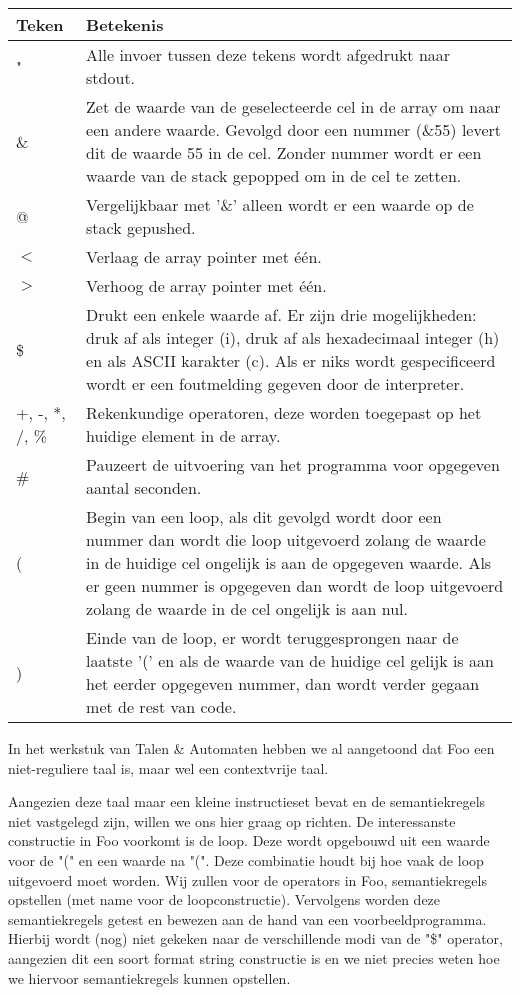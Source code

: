 \documentclass[11pt]{article}
\begin{document}
\begin{center}
    \begin{tabular}{ | l | p{15cm} |}
    \hline
    Teken & Betekenis \\ \hline
    " & Alle invoer tussen deze tekens wordt afgedrukt naar stdout. \\ \hline
    \& & Zet de waarde van de geselecteerde cel in de array om naar een andere waarde. Gevolgd door een nummer (\&55) levert dit de waarde 55 in de cel. Zonder nummer wordt er een waarde van de stack gepopped om in de cel te zetten. \\ \hline
    @ & Vergelijkbaar met '\&' alleen wordt er een waarde op de stack gepushed. \\ \hline
    \(<\) & Verlaag de array pointer met \'e\'en. \\ \hline
    \(>\) & Verhoog de array pointer met \'e\'en. \\ \hline
    \$ & Drukt een enkele waarde af. Er zijn drie mogelijkheden: druk af als integer (i), druk af als hexadecimaal integer (h) en als ASCII karakter (c). Als er niks wordt gespecificeerd wordt er een foutmelding gegeven door de interpreter. \\ \hline
    +, -, *, /, \% & Rekenkundige operatoren, deze worden toegepast op het huidige element in de array. \\ \hline
    \# & Pauzeert de uitvoering van het programma voor opgegeven aantal seconden. \\ \hline
    ( & Begin van een loop, als dit gevolgd wordt door een nummer dan wordt die loop uitgevoerd zolang de waarde in de huidige cel ongelijk is aan de opgegeven waarde. Als er geen nummer is opgegeven dan wordt de loop uitgevoerd zolang de waarde in de cel ongelijk is aan nul. \\ \hline
    ) & Einde van de loop, er wordt teruggesprongen naar de laatste '(' en als de waarde van de huidige cel gelijk is aan het eerder opgegeven nummer, dan wordt verder gegaan met de rest van code. \\ \hline
  

    \hline
    \end{tabular}
\end{center}

In het werkstuk van Talen \& Automaten hebben we al aangetoond dat Foo een niet-reguliere taal is, maar wel een contextvrije taal.

Aangezien deze taal maar een kleine instructieset bevat en de semantiekregels niet vastgelegd zijn, willen we ons hier graag op richten. De interessanste constructie in Foo voorkomt is de loop. Deze wordt opgebouwd uit een waarde voor de "(" en een waarde na "(". Deze combinatie houdt bij hoe vaak de loop uitgevoerd moet worden. Wij zullen voor de operators in Foo, semantiekregels opstellen (met name voor de loopconstructie). Vervolgens worden deze semantiekregels getest en bewezen aan de hand van een voorbeeldprogramma.
Hierbij wordt (nog) niet gekeken naar de verschillende modi van de "\$" operator, aangezien dit een soort format string constructie is en we niet precies weten hoe we hiervoor semantiekregels kunnen opstellen.
\end{document}
